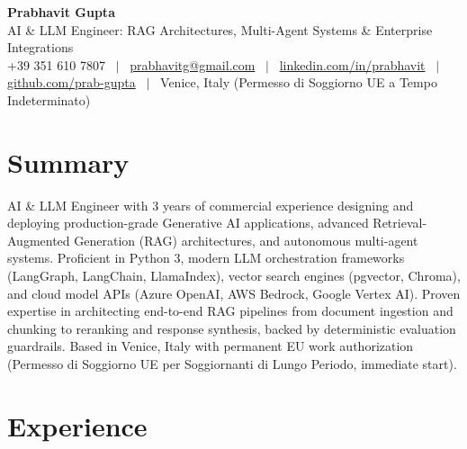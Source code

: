 \documentclass[a4paper,10pt]{article}
\begin{document}
\begin{minipage}[c]{0.80\textwidth}
  {\Huge\bfseries Prabhavit Gupta}\\[3pt]
  {\color{accent}\large AI \& LLM Engineer: RAG Architectures, Multi-Agent Systems \& Enterprise Integrations}\\[6pt]
  {\footnotesize +39 351 610 7807 ~$\vert$~
  \href{mailto:prabhavitg@gmail.com}{prabhavitg@gmail.com} ~$\vert$~
  \href{https://www.linkedin.com/in/prabhavit/}{linkedin.com/in/prabhavit} ~$\vert$~
  \href{https://github.com/prab-gupta}{github.com/prab-gupta} ~$\vert$~
  Venice, Italy (Permesso di Soggiorno UE a Tempo Indeterminato)}
\end{minipage}\hfill

\section{Summary}
AI \& LLM Engineer with 3 years of commercial experience designing and deploying production-grade Generative AI applications, advanced Retrieval-Augmented Generation (RAG) architectures, and autonomous multi-agent systems. Proficient in Python 3, modern LLM orchestration frameworks (LangGraph, LangChain, LlamaIndex), vector search engines (pgvector, Chroma), and cloud model APIs (Azure OpenAI, AWS Bedrock, Google Vertex AI). Proven expertise in architecting end-to-end RAG pipelines from document ingestion and chunking to reranking and response synthesis, backed by deterministic evaluation guardrails. Based in Venice, Italy with permanent EU work authorization (Permesso di Soggiorno UE per Soggiornanti di Lungo Periodo, immediate start).

\section{Experience}
\end{document}

